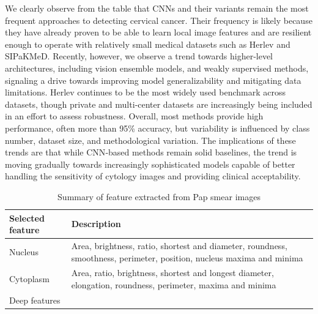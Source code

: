 \documentclass[final,5p,times,twocolumn,authoryear]{elsarticle}
\begin{document}
We clearly observe from the table that CNNs and their variants remain the most frequent approaches to detecting cervical cancer. Their frequency is likely because they have already proven to be able to learn local image features and are resilient enough to operate with relatively small medical datasets such as Herlev and SIPaKMeD. Recently, however, we observe a trend towards higher‑level architectures, including vision ensemble models, and weakly supervised methods, signaling a drive towards improving model generalizability and mitigating data limitations. Herlev continues to be the most widely used benchmark across datasets, though private and multi‑center datasets are increasingly being included in an effort to assess robustness. Overall, most methods provide high performance, often more than 95\% accuracy, but variability is influenced by class number, dataset size, and methodological variation. The implications of these trends are that while CNN‑based methods remain solid baselines, the trend is moving gradually towards increasingly sophisticated models capable of better handling the sensitivity of cytology images and providing clinical acceptability.
\begin{table}
\centering
\caption{Summary of feature extracted from Pap smear images}
\label{tab:features}
\begin{tabular}{|l|p{10cm}|}
\hline
\textbf{Selected feature} & \textbf{Description} \\
\hline
Nucleus & Area, brightness, ratio, shortest and diameter, roundness, smoothness, perimeter, position, nucleus maxima and minima \\
\hline
Cytoplasm & Area, ratio, brightness, shortest and longest diameter, elongation, roundness, perimeter, maxima and minima \\
\hline
Deep features & \\
\hline
\end{tabular}
\end{table}
\end{document}
